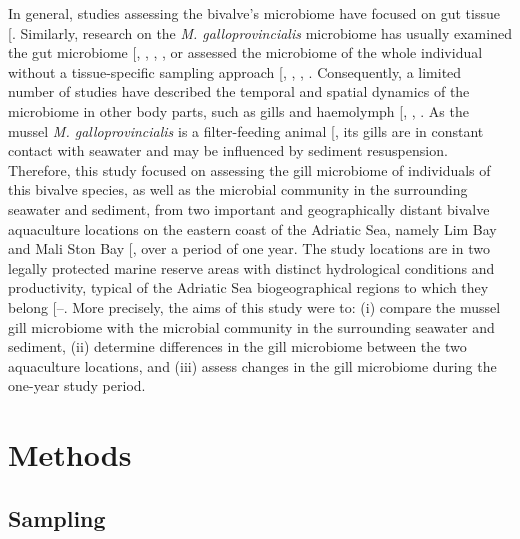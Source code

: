 \documentclass[
  12 pt,
]{article}
\begin{document}
In general, studies assessing the bivalve's microbiome have focused on gut tissue {[}\citeproc{ref-Salloum2025}{2}{]}. Similarly, research on the \emph{M. galloprovincialis} microbiome has usually examined the gut microbiome {[}, , , , \citeproc{ref-Wathsala2021}{30}{]} or assessed the microbiome of the whole individual without a tissue-specific sampling approach {[}, , , \citeproc{ref-Schoinas2023}{29}{]}. Consequently, a limited number of studies have described the temporal and spatial dynamics of the microbiome in other body parts, such as gills and haemolymph {[}, , \citeproc{ref-Zardinoni2024}{31}{]}. As the mussel \emph{M. galloprovincialis} is a filter-feeding animal {[}\citeproc{ref-Gosling2003a}{37}{]}, its gills are in constant contact with seawater and may be influenced by sediment resuspension. Therefore, this study focused on assessing the gill microbiome of individuals of this bivalve species, as well as the microbial community in the surrounding seawater and sediment, from two important and geographically distant bivalve aquaculture locations on the eastern coast of the Adriatic Sea, namely Lim Bay and Mali Ston Bay {[}\citeproc{ref-BratosCetinic2024}{38}{]}, over a period of one year. The study locations are in two legally protected marine reserve areas with distinct hydrological conditions and productivity, typical of the Adriatic Sea biogeographical regions to which they belong {[}--\citeproc{ref-Skejic2015}{42}{]}. More precisely, the aims of this study were to: (i) compare the mussel gill microbiome with the microbial community in the surrounding seawater and sediment, (ii) determine differences in the gill microbiome between the two aquaculture locations, and (iii) assess changes in the gill microbiome during the one-year study period.

\section{Methods}\label{methods}

\subsection{Sampling}\label{sampling}
\end{document}
